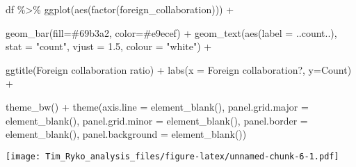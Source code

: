 \documentclass[
]{article}
\newenvironment{Shaded}{\begin{snugshade}}{\end{snugshade}}
\newcommand{\AttributeTok}[1]{\textcolor[rgb]{0.77,0.63,0.00}{#1}}
\newcommand{\FloatTok}[1]{\textcolor[rgb]{0.00,0.00,0.81}{#1}}
\newcommand{\FunctionTok}[1]{\textcolor[rgb]{0.00,0.00,0.00}{#1}}
\newcommand{\NormalTok}[1]{#1}
\newcommand{\SpecialCharTok}[1]{\textcolor[rgb]{0.00,0.00,0.00}{#1}}
\newcommand{\StringTok}[1]{\textcolor[rgb]{0.31,0.60,0.02}{#1}}
\begin{document}
\begin{Shaded}
\begin{Highlighting}[]
\NormalTok{df }\SpecialCharTok{\%\textgreater{}\%}
  \FunctionTok{ggplot}\NormalTok{(}\FunctionTok{aes}\NormalTok{(}\FunctionTok{factor}\NormalTok{(foreign\_collaboration))) }\SpecialCharTok{+}
    
    \FunctionTok{geom\_bar}\NormalTok{(}\AttributeTok{fill=}\StringTok{\textquotesingle{}\#69b3a2\textquotesingle{}}\NormalTok{, }\AttributeTok{color=}\StringTok{\textquotesingle{}\#e9ecef\textquotesingle{}}\NormalTok{) }\SpecialCharTok{+}
    \FunctionTok{geom\_text}\NormalTok{(}\FunctionTok{aes}\NormalTok{(}\AttributeTok{label =}\NormalTok{ ..count..), }\AttributeTok{stat =} \StringTok{"count"}\NormalTok{, }\AttributeTok{vjust =} \FloatTok{1.5}\NormalTok{, }\AttributeTok{colour =} \StringTok{"white"}\NormalTok{) }\SpecialCharTok{+}
    
    \FunctionTok{ggtitle}\NormalTok{(}\StringTok{\textquotesingle{}Foreign collaboration ratio\textquotesingle{}}\NormalTok{) }\SpecialCharTok{+}
    \FunctionTok{labs}\NormalTok{(}\AttributeTok{x =} \StringTok{\textquotesingle{}Foreign collaboration?\textquotesingle{}}\NormalTok{, }\AttributeTok{y=}\StringTok{\textquotesingle{}Count\textquotesingle{}}\NormalTok{) }\SpecialCharTok{+}
    
    \FunctionTok{theme\_bw}\NormalTok{() }\SpecialCharTok{+}
    \FunctionTok{theme}\NormalTok{(}\AttributeTok{axis.line =} \FunctionTok{element\_blank}\NormalTok{(),}
      \AttributeTok{panel.grid.major =} \FunctionTok{element\_blank}\NormalTok{(),}
      \AttributeTok{panel.grid.minor =} \FunctionTok{element\_blank}\NormalTok{(),}
      \AttributeTok{panel.border =} \FunctionTok{element\_blank}\NormalTok{(),}
      \AttributeTok{panel.background =} \FunctionTok{element\_blank}\NormalTok{())}
\end{Highlighting}
\end{Shaded}

\texttt{[image: Tim\_Ryko\_analysis\_files/figure-latex/unnamed-chunk-6-1.pdf]}
\end{document}
